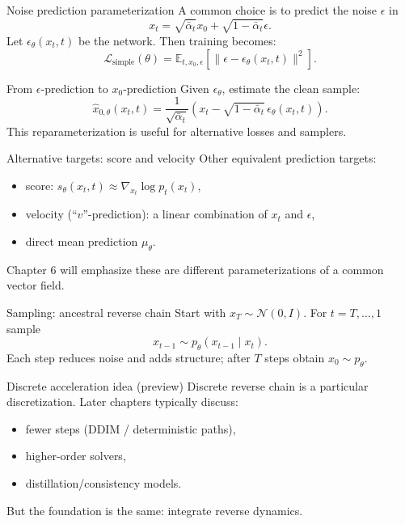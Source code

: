 \documentclass[aspectratio=169]{beamer}
\begin{document}
\begin{frame}{Noise prediction parameterization}
A common choice is to predict the noise \(\epsilon\) in
\[
x_t=\sqrt{\bar\alpha_t}x_0+\sqrt{1-\bar\alpha_t}\epsilon.
\]
Let \(\epsilon_\theta(x_t,t)\) be the network. Then training becomes:
\[
\mathcal{L}_{\text{simple}}(\theta)=\mathbb{E}_{t,x_0,\epsilon}\left[\|\epsilon-\epsilon_\theta(x_t,t)\|^2\right].
\]
\end{frame}

\begin{frame}{From \(\epsilon\)-prediction to \(x_0\)-prediction}
Given \(\epsilon_\theta\), estimate the clean sample:
\[
\hat x_{0,\theta}(x_t,t)=\frac{1}{\sqrt{\bar\alpha_t}}\left(x_t-\sqrt{1-\bar\alpha_t}\,\epsilon_\theta(x_t,t)\right).
\]
This reparameterization is useful for alternative losses and samplers.
\end{frame}

\begin{frame}{Alternative targets: score and velocity}
Other equivalent prediction targets:
\begin{itemize}
\item score: \(s_\theta(x_t,t)\approx \nabla_{x_t}\log p_t(x_t)\),
\item velocity (``\(v\)''-prediction): a linear combination of \(x_t\) and \(\epsilon\),
\item direct mean prediction \(\mu_\theta\).
\end{itemize}
Chapter 6 will emphasize these are different parameterizations of a common vector field.
\end{frame}

\begin{frame}{Sampling: ancestral reverse chain}
Start with \(x_T\sim\mathcal{N}(0,I)\).
For \(t=T,\dots,1\) sample
\[
x_{t-1}\sim p_\theta(x_{t-1}\mid x_t).
\]
Each step reduces noise and adds structure; after \(T\) steps obtain \(x_0\sim p_\theta\).
\end{frame}

\begin{frame}{Discrete acceleration idea (preview)}
Discrete reverse chain is a particular discretization.
Later chapters typically discuss:
\begin{itemize}
\item fewer steps (DDIM / deterministic paths),
\item higher-order solvers,
\item distillation/consistency models.
\end{itemize}
But the foundation is the same: integrate reverse dynamics.
\end{frame}
\end{document}

